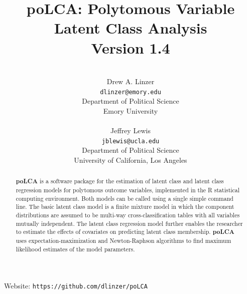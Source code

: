 \documentclass[letterpaper,12pt]{article}
\begin{document}
\newcommand\var{{\rm Var}}

\title{\textbf{poLCA}: Polytomous Variable\\ Latent Class Analysis \\ \vspace{0.1in} Version 1.4\\}

\author{\\Drew A. Linzer\\
\texttt{dlinzer@emory.edu} \\
Department of Political Science \\
Emory University \\
\\
Jeffrey Lewis \\
\texttt{jblewis@ucla.edu} \\
Department of Political Science \\
University of California, Los Angeles}

\vspace{0.1in}

\date{} \maketitle

\begin{center}
Website: \texttt{https://github.com/dlinzer/poLCA}
\end{center}

\vspace{0.1in}

\begin{abstract}
\noindent \textbf{poLCA} is a software package for the estimation of latent class and latent class regression models for polytomous outcome variables, implemented in the \textsf{R} statistical computing environment. Both models can be called using a single simple command line. The basic latent class model is a finite mixture model in which the component distributions are assumed to be multi-way cross-classification tables with all variables mutually independent. The latent class regression model further enables the researcher to estimate the effects of covariates on predicting latent class membership. \textbf{poLCA} uses expectation-maximization and Newton-Raphson algorithms to find maximum likelihood estimates of the model parameters.
\end{abstract}

\vspace{0.1in}
\end{document}
